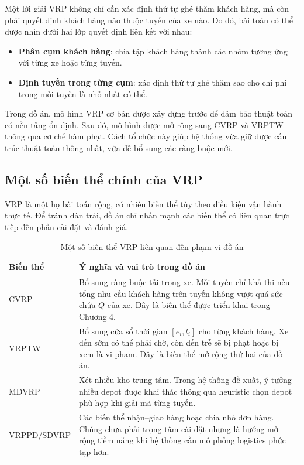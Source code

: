 \documentclass[12pt,a4paper]{article}
\numberwithin{figure}{subsection}
\numberwithin{table}{subsection}
\begin{document}
Một lời giải VRP không chỉ cần xác định thứ tự ghé thăm khách hàng, mà còn phải quyết định khách hàng nào thuộc tuyến của xe nào. Do đó, bài toán có thể được nhìn dưới hai lớp quyết định liên kết với nhau:
\begin{itemize}[label={ $\circ$}, leftmargin=1.5cm]
    \item \textbf{Phân cụm khách hàng}: chia tập khách hàng thành các nhóm tương ứng với từng xe hoặc từng tuyến.
    \item \textbf{Định tuyến trong từng cụm}: xác định thứ tự ghé thăm sao cho chi phí trong mỗi tuyến là nhỏ nhất có thể.
\end{itemize}

Trong đồ án, mô hình VRP cơ bản được xây dựng trước để đảm bảo thuật toán có nền tảng ổn định. Sau đó, mô hình được mở rộng sang CVRP và VRPTW thông qua cơ chế hàm phạt. Cách tổ chức này giúp hệ thống vừa giữ được cấu trúc thuật toán thống nhất, vừa dễ bổ sung các ràng buộc mới.

\subsection{Một số biến thể chính của VRP}
VRP là một họ bài toán rộng, có nhiều biến thể tùy theo điều kiện vận hành thực tế. Để tránh dàn trải, đồ án chỉ nhấn mạnh các biến thể có liên quan trực tiếp đến phần cài đặt và đánh giá.

\begin{table}[htbp]
    \centering
    \caption{Một số biến thể VRP liên quan đến phạm vi đồ án}
    \label{tab:vrp_variants_compact}
    \renewcommand{\arraystretch}{1.35}
    \begin{tabular}{|p{3.7cm}|p{10.2cm}|}
        \hline
        \textbf{Biến thể} & \textbf{Ý nghĩa và vai trò trong đồ án} \\
        \hline
        CVRP & Bổ sung ràng buộc tải trọng xe. Mỗi tuyến chỉ khả thi nếu tổng nhu cầu khách hàng trên tuyến không vượt quá sức chứa $Q$ của xe. Đây là biến thể được triển khai trong Chương 4. \\
        \hline
        VRPTW & Bổ sung cửa sổ thời gian $[e_i,l_i]$ cho từng khách hàng. Xe đến sớm có thể phải chờ, còn đến trễ sẽ bị phạt hoặc bị xem là vi phạm. Đây là biến thể mở rộng thứ hai của đồ án. \\
        \hline
        MDVRP & Xét nhiều kho trung tâm. Trong hệ thống đề xuất, ý tưởng nhiều depot được khai thác thông qua heuristic chọn depot phù hợp khi giải mã từng tuyến. \\
        \hline
        VRPPD/SDVRP & Các biến thể nhận--giao hàng hoặc chia nhỏ đơn hàng. Chúng chưa phải trọng tâm cài đặt nhưng là hướng mở rộng tiềm năng khi hệ thống cần mô phỏng logistics phức tạp hơn. \\
        \hline
    \end{tabular}
\end{table}
\end{document}
